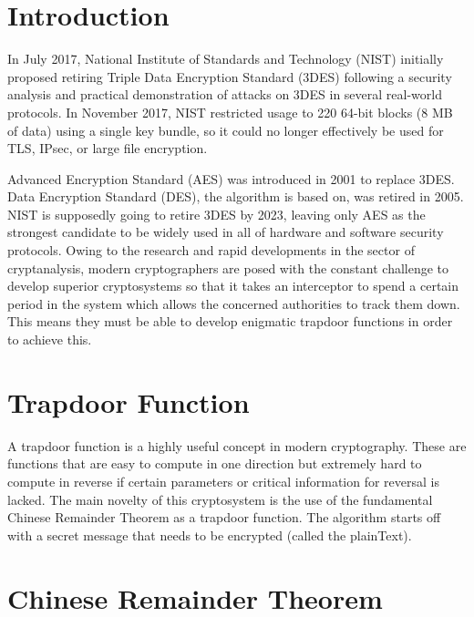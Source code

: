 \newpage
\section{Introduction}
\label{intro}
In July 2017, National Institute of Standards and Technology (NIST) initially proposed retiring Triple Data Encryption Standard (3DES) following a security analysis and practical demonstration of attacks on 3DES in several real-world protocols. In November 2017, NIST restricted usage to 220 64-bit blocks (8 MB of data) using a single key bundle, so it could no longer effectively be used for TLS, IPsec, or large file encryption.

Advanced Encryption Standard (AES) was introduced in 2001 to replace 3DES. Data Encryption Standard (DES), the algorithm is based on, was retired in 2005. NIST is supposedly going to retire 3DES by 2023, leaving only AES as the strongest candidate to be widely used in all of hardware and software security protocols. Owing to the research and rapid developments in the sector of cryptanalysis, modern cryptographers are posed with the constant challenge to develop superior cryptosystems so that it takes an interceptor to spend a certain period in the system which allows the concerned authorities to track them down. This means they must be able to develop enigmatic trapdoor functions in order to achieve this.

\section{Trapdoor Function}
\label{sec:2}
\begin{flushleft}
A trapdoor function is a highly useful concept in modern cryptography. These are functions that are easy to compute in one direction but extremely hard to compute in reverse if certain parameters or critical information for reversal is lacked. The main novelty of this cryptosystem is the use of the fundamental Chinese Remainder Theorem as a trapdoor function. The algorithm starts off with a secret message that needs to be encrypted (called the plainText).
\end{flushleft}

\section{Chinese Remainder Theorem}
\label{sec:3}
